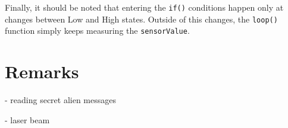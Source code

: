 \documentclass[12pt]{report}
\begin{document}
Finally, it should be noted that entering the \verb|if()| conditions happen only at changes between Low and High states. Outside of this changes, the \verb|loop()| function simply keeps measuring the \verb|sensorValue|.




\chapter{Remarks}

- reading secret alien messages

- laser beam




\newpage


\begin{thebibliography}{50}

\end{thebibliography}
\end{document}

